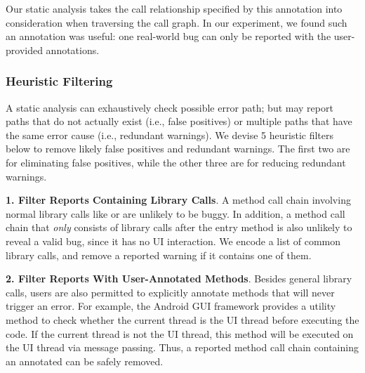 {}


Our static analysis  takes the call relationship specified by this
annotation into consideration when traversing the call graph. In our experiment,
we found such an annotation was useful: one real-world bug can only be reported
with the user-provided annotations.

\subsubsection{Heuristic Filtering}
\label{sec:heuristic}

A static analysis can exhaustively check possible error path; but may report
paths that do not actually exist (i.e., false positives) or multiple paths
 that have the same error cause (i.e., redundant warnings). We devise
5 heuristic filters below to remove likely false positives and redundant warnings.
The first two are for eliminating false positives, while the
other three are for reducing redundant warnings.




\textbf{1. Filter Reports Containing Library Calls}. A
method call chain involving normal library calls
like  or  are unlikely to
be buggy. In addition, a method call chain that \textit{only}
consists of library calls after the entry method is also unlikely
to reveal a valid bug, since it has no UI interaction.
We encode a list of common library calls, and remove
a reported warning if it contains one of them.

\textbf{2. Filter Reports With User-Annotated Methods}. Besides general
library calls, users are also permitted
to explicitly annotate methods that will never trigger an error.
For example, the Android GUI framework provides a utility method 
 to check whether the current thread is the UI thread
before executing the code. If the current thread is not the UI thread,
this method will be executed on the UI thread via message passing.
Thus, a reported method call chain containing an annotated 
can be safely removed.

